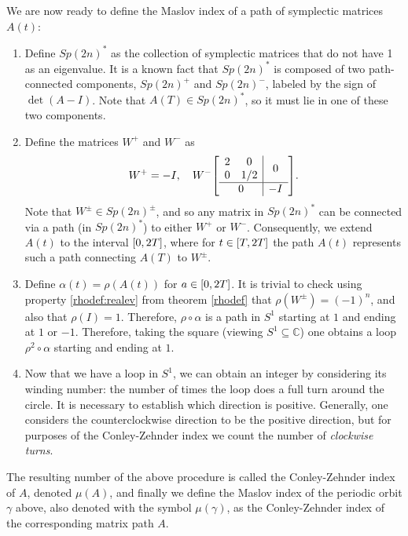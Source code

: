 \documentclass{article}
\theoremstyle{nonumberplain}
\newcommand{\C}{\mathbb{C}}
\begin{document}
We are now ready to define the Maslov index of a path of symplectic matrices $A(t)$:

\begin{enumerate}[algorithm]
\item Define $Sp(2n)^*$ as the collection of symplectic matrices that do not have 1 as an eigenvalue. It is a known fact \cite[proposition~7.1.4]{audin} that $Sp(2n)^*$ is composed of two path-connected components, $Sp(2n)^+$ and $Sp(2n)^-$, labeled by the sign of $\det(A-I)$. Note that $A(T) \in Sp(2n)^*$, so it must lie in one of these two components.
\item\label{maslov:step2} Define the matrices $W^+$ and $W^-$ as
\begin{equation}
W^+ = - I, \quad W^- \mleft[\begin{array}{c|c}
\begin{matrix} 2 & 0 \\ 0 & 1/2 \end{matrix} & 0\\
\hline
0 & -I
\end{array}\mright].
\end{equation}
Note that $W^\pm \in Sp(2n)^\pm$, and so any matrix in $Sp(2n)^*$ can be connected via a path (in $Sp(2n)^*$) to either $W^+$ or $W^-$. Consequently, we extend $A(t)$ to the interval $\interval 0 {2T}$, where for $t \in \interval T {2T}$ the path $A(t)$ represents such a path connecting $A(T)$ to $W^\pm$.
\item Define $\alpha(t) = \rho(A(t))$ for $a \in \interval 0 {2T}$. It is trivial to check using property \ref{rhodef:realev} from theorem \ref{rhodef} that $\rho(W^\pm) = (-1)^n$, and also that $\rho(I) = 1$. Therefore, $\rho \circ \alpha$ is a path in $S^1$ starting at $1$ and ending at $1$ or $-1$. Therefore, taking the square (viewing $S^1 \subseteq \C$) one obtains a loop $\rho^2 \circ \alpha$ starting and ending at $1$.
\item Now that we have a loop in $S^1$, we can obtain an integer by considering its winding number: the number of times the loop does a full turn around the circle. It is necessary to establish which direction is positive. Generally, one considers the counterclockwise direction to be the positive direction, but for purposes of the Conley-Zehnder index we count the number of \emph{clockwise turns}.
\end{enumerate}
The resulting number of the above procedure is called the Conley-Zehnder index of $A$, denoted $\mu(A)$, and finally we define the Maslov index of the periodic orbit $\gamma$ above, also denoted with the symbol $\mu(\gamma)$, as the Conley-Zehnder index of the corresponding matrix path $A$.
\end{document}
